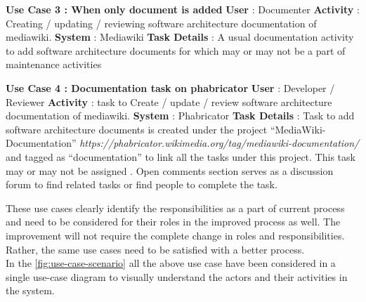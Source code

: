 \begin{mdframed}[leftmargin=10pt,rightmargin=-10pt]
\textbf{Use Case 3 : When only document is added}
 \newline \newline \indent \textbf{User} : Documenter
 \newline \newline \indent \textbf{Activity} : Creating / updating / reviewing software architecture documentation of mediawiki.
 \newline \newline \indent \textbf{System} : Mediawiki
 \newline \newline \indent \textbf{Task Details} : A usual documentation activity to add software architecture documents for which may or may not be a part of maintenance activities
\end{mdframed}

\begin{mdframed}[leftmargin=10pt,rightmargin=-10pt]
\textbf{Use Case 4 : Documentation task on phabricator}
\newline \newline \indent \textbf{User} : Developer / Reviewer
\newline \newline \indent \textbf{Activity} : task to Create / update / review software architecture documentation of mediawiki.
\newline \newline \indent \textbf{System} : Phabricator
\newline \newline \indent \textbf{Task Details} : Task to add software architecture documents is created under the project \enquote{MediaWiki-Documentation} \emph{https://phabricator.wikimedia.org/tag/mediawiki-documentation/} and tagged as \enquote{documentation} to link all the tasks under this project. This task may or may not be assigned . Open comments section serves as a discussion forum to find related tasks or find people to complete the task.
\end{mdframed}
These use cases clearly identify the responsibilities as a part of current process and need to be considered for their roles in the improved process as well. The improvement will not require the complete change in roles and responsibilities. Rather, the same use cases need to be satisfied with a better process.
\newline
\\\indent In the \autoref{fig:use-case-scenario} all the above use case have been considered in a single use-case diagram to visually understand the actors and their activities in the system.

